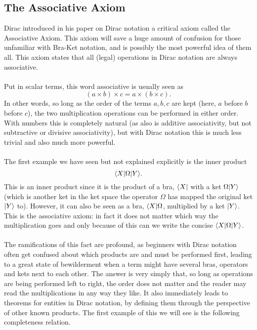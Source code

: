 \subsection{The Associative Axiom}
Dirac introduced in his paper on Dirac notation a critical axiom called the Associative Axiom. This axiom will save a huge amount of confusion for those unfamiliar with Bra-Ket notation, and is possibly the most powerful idea of them all. This axiom states that all (legal)  operations in Dirac notation are always associative.
\\\\
Put in scalar terms, this word associative is usually seen as
$$
(a\times b)\times c = a \times (b\times c).
$$
In other words, so long as the order of the terms $a,b,c$ are kept (here, $a$ before $b$ before $c$), the two multiplication operations can be performed in either order. With numbers this is completely natural (as also is additive associativity, but not subtractive or divisive associativity), but with Dirac notation this is much less trivial and also much more powerful.
\\\\
The first example we have seen but not explained explicitly is the inner product 
$$
\langle X|{\Omega}|Y\rangle.
$$
This is an inner product since it is the product of a bra, $\langle X|$ with a ket $\Omega|Y\rangle$ (which is another ket in the ket space the operator $\Omega$ has mapped the original ket $|Y\rangle$ to). However, it can also be seen as a bra, $\langle X|\Omega$, multiplied by a ket $|Y\rangle$. This is the associative axiom: in fact it does not matter which way the multiplication goes and only because of this can we write the concise $\langle X|{\Omega}|Y\rangle$.
\\\\
The ramifications of this fact are profound, as beginners with Dirac notation often get confused about which products are  and must be performed first, leading to a great state of bewilderment when a term might have several bras, operators and kets next to each other. The answer is very simply that, so long as operations are being performed left to right, the order does not matter and the reader may read the multiplications in any way they like. It also immediately leads to theorems for entities in Dirac notation, by defining them through the perspective of other known products. The first example of this we will see is the following completeness relation.
\\\\

